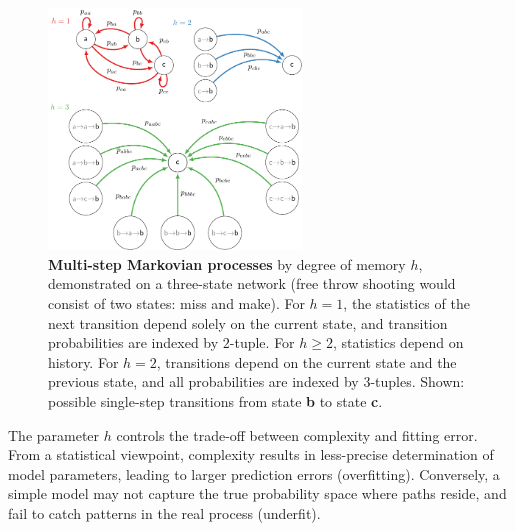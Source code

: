 \documentclass{IOS-Book-Article}
\renewcommand{\bf}[1]{\textbf{#1}}
\begin{document}
 
 
  \begin{figure}
 \includegraphics[width=0.6\textwidth]{fig1a}
 \caption{\bf{Multi-step Markovian processes}  by degree of memory $h$, demonstrated on a three-state network (free throw shooting would consist of two states: miss and make). For $h=1$, the statistics of the next transition depend solely on the current state, and transition probabilities are indexed by  $2$-tuple. For $h\geq2$, statistics depend on history. For $h=2$, transitions depend on the
 current state and the previous state, and all probabilities are indexed by $3$-tuples.  Shown:  possible single-step transitions from state \bf{b} to state \bf{c}.  } \label{fig:fig1}
 \end{figure}

The parameter $h$ controls the trade-off between complexity and fitting error. From a statistical viewpoint, complexity results in less-precise determination of model parameters, leading to larger prediction errors (overfitting). Conversely, a simple model may not capture the true probability space where paths reside, and fail to catch patterns in the real process (underfit).
\end{document}
